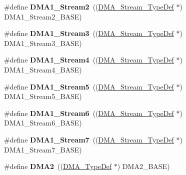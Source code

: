 \begin{DoxyCompactItemize}
\item 
\hypertarget{group___peripheral__declaration_gad0e2140b8eeec3594035f1a7bf2a7250}{\#define {\bfseries D\-M\-A1\-\_\-\-Stream2}~((\hyperlink{struct_d_m_a___stream___type_def}{D\-M\-A\-\_\-\-Stream\-\_\-\-Type\-Def} $\ast$) D\-M\-A1\-\_\-\-Stream2\-\_\-\-B\-A\-S\-E)}\label{group___peripheral__declaration_gad0e2140b8eeec3594035f1a7bf2a7250}

\item 
\hypertarget{group___peripheral__declaration_ga96ac1af7a92469fe86a9fbdec091f25d}{\#define {\bfseries D\-M\-A1\-\_\-\-Stream3}~((\hyperlink{struct_d_m_a___stream___type_def}{D\-M\-A\-\_\-\-Stream\-\_\-\-Type\-Def} $\ast$) D\-M\-A1\-\_\-\-Stream3\-\_\-\-B\-A\-S\-E)}\label{group___peripheral__declaration_ga96ac1af7a92469fe86a9fbdec091f25d}

\item 
\hypertarget{group___peripheral__declaration_ga87df45f4b82e0b3a8c1b17f1a77aecdb}{\#define {\bfseries D\-M\-A1\-\_\-\-Stream4}~((\hyperlink{struct_d_m_a___stream___type_def}{D\-M\-A\-\_\-\-Stream\-\_\-\-Type\-Def} $\ast$) D\-M\-A1\-\_\-\-Stream4\-\_\-\-B\-A\-S\-E)}\label{group___peripheral__declaration_ga87df45f4b82e0b3a8c1b17f1a77aecdb}

\item 
\hypertarget{group___peripheral__declaration_gac3abc20f80e25c19b02104ad34eae652}{\#define {\bfseries D\-M\-A1\-\_\-\-Stream5}~((\hyperlink{struct_d_m_a___stream___type_def}{D\-M\-A\-\_\-\-Stream\-\_\-\-Type\-Def} $\ast$) D\-M\-A1\-\_\-\-Stream5\-\_\-\-B\-A\-S\-E)}\label{group___peripheral__declaration_gac3abc20f80e25c19b02104ad34eae652}

\item 
\hypertarget{group___peripheral__declaration_gac95127480470900755953f1cfe68567d}{\#define {\bfseries D\-M\-A1\-\_\-\-Stream6}~((\hyperlink{struct_d_m_a___stream___type_def}{D\-M\-A\-\_\-\-Stream\-\_\-\-Type\-Def} $\ast$) D\-M\-A1\-\_\-\-Stream6\-\_\-\-B\-A\-S\-E)}\label{group___peripheral__declaration_gac95127480470900755953f1cfe68567d}

\item 
\hypertarget{group___peripheral__declaration_ga8ecdeaf43d0f4207dab1fdb4d7bf8d26}{\#define {\bfseries D\-M\-A1\-\_\-\-Stream7}~((\hyperlink{struct_d_m_a___stream___type_def}{D\-M\-A\-\_\-\-Stream\-\_\-\-Type\-Def} $\ast$) D\-M\-A1\-\_\-\-Stream7\-\_\-\-B\-A\-S\-E)}\label{group___peripheral__declaration_ga8ecdeaf43d0f4207dab1fdb4d7bf8d26}

\item 
\hypertarget{group___peripheral__declaration_ga506520140eec1708bc7570c49bdf972d}{\#define {\bfseries D\-M\-A2}~((\hyperlink{struct_d_m_a___type_def}{D\-M\-A\-\_\-\-Type\-Def} $\ast$) D\-M\-A2\-\_\-\-B\-A\-S\-E)}\label{group___peripheral__declaration_ga506520140eec1708bc7570c49bdf972d}


\end{DoxyCompactItemize}
